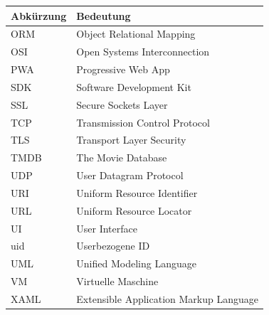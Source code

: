\documentclass[11pt,a4paper]{article}
\begin{document}
\noindent
\begin{center}
\begin{table}[tt]
    \begin{tabular}{ l p{8cm} }
    \toprule
    \textbf{Abkürzung} & \textbf{Bedeutung} \\
    \midrule
ORM   & Object Relational Mapping \\
OSI   & Open Systems Interconnection \\
PWA   & Progressive Web App  \\
SDK   & Software Development Kit \\
SSL   & Secure Sockets Layer \\
TCP   & Transmission Control Protocol \\
TLS   & Transport Layer Security \\
TMDB  & The Movie Database  \\
UDP   & User Datagram Protocol \\
URI   & Uniform Resource Identifier \\
URL   & Uniform Resource Locator \\
UI    & User Interface \\
uid   & Userbezogene ID \\
UML   & Unified Modeling Language \\
VM    & Virtuelle Maschine \\
XAML  & Extensible Application Markup Language \\
	\end{tabular}
\end{table}
\end{center}


\clearpage
\end{document}
